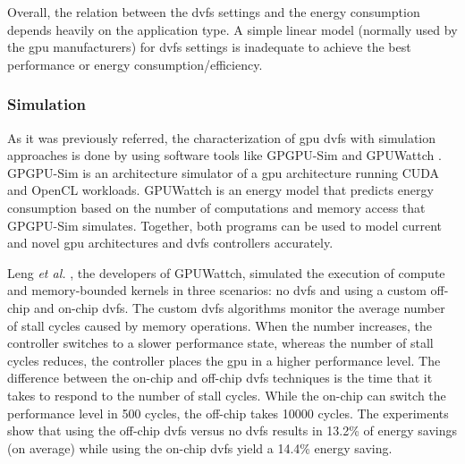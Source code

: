 Overall, the relation between the \acrshort{dvfs} settings and the energy consumption depends heavily on the application type. A simple linear model (normally used by the \acrshort{gpu} manufacturers) for \acrshort{dvfs} settings is inadequate to achieve the best performance or energy consumption/efficiency.

\subsubsection{Simulation}

As it was previously referred, the characterization of \acrshort{gpu} \acrshort{dvfs} with simulation approaches is done by using software tools like GPGPU-Sim \cite{noauthor_gpgpu-sim/gpgpu-sim_distribution_2019} and GPUWattch \cite{noauthor_gpu_2011} \cite{leng_gpuwattch:_2013}. GPGPU-Sim is an architecture simulator of a \acrshort{gpu} architecture running CUDA and OpenCL workloads. GPUWattch is an energy model that predicts energy consumption based on the number of computations and memory access that GPGPU-Sim simulates. Together, both programs can be used to model current and novel \acrshort{gpu} architectures and \acrshort{dvfs} controllers accurately.

Leng \textit{et al.} \cite{leng_gpuwattch:_2013}, the developers of GPUWattch, simulated the execution of compute and memory-bounded kernels in three scenarios: no \acrshort{dvfs} and using a custom off-chip and on-chip \acrshort{dvfs}. The custom \acrshort{dvfs} algorithms monitor the average number of stall cycles caused by memory operations. When the number increases, the controller switches to a slower performance state, whereas the number of stall cycles reduces, the controller places the \acrshort{gpu} in a higher performance level. The difference between the on-chip and off-chip \acrshort{dvfs} techniques is the time that it takes to respond to the number of stall cycles. While the on-chip can switch the performance level in 500 cycles, the off-chip takes 10000 cycles. The experiments show that using the off-chip \acrshort{dvfs} versus no \acrshort{dvfs} results in 13.2\% of energy savings (on average) while using the on-chip \acrshort{dvfs} yield a 14.4\% energy saving.

